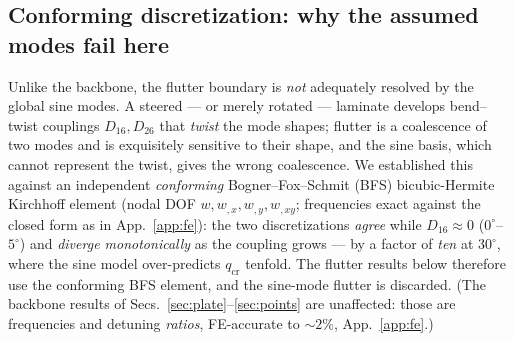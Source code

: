\documentclass[11pt]{article}
\begin{document}
\subsection{Conforming discretization: why the assumed modes fail here}\label{sec:flutter-fe}
Unlike the backbone, the flutter boundary is \emph{not} adequately resolved by the global sine
modes. A steered --- or merely rotated --- laminate develops bend--twist couplings $D_{16},D_{26}$
that \emph{twist} the mode shapes; flutter is a coalescence of two modes and is exquisitely sensitive
to their shape, and the sine basis, which cannot represent the twist, gives the wrong coalescence. We
established this against an independent \emph{conforming} Bogner--Fox--Schmit (BFS) bicubic-Hermite
Kirchhoff element (nodal DOF $w,w_{,x},w_{,y},w_{,xy}$; frequencies exact against the closed form as in
App.~\ref{app:fe}): the two discretizations \emph{agree} while $D_{16}\!\approx\!0$
($0^\circ$--$5^\circ$) and \emph{diverge monotonically} as the coupling grows --- by a factor of
\emph{ten} at $30^\circ$, where the sine model over-predicts $q_{\mathrm{cr}}$ tenfold. The flutter
results below therefore use the conforming BFS element, and the sine-mode flutter is discarded. (The
backbone results of Secs.~\ref{sec:plate}--\ref{sec:points} are unaffected: those are frequencies and
detuning \emph{ratios}, FE-accurate to $\sim\!2\%$, App.~\ref{app:fe}.)
\end{document}
